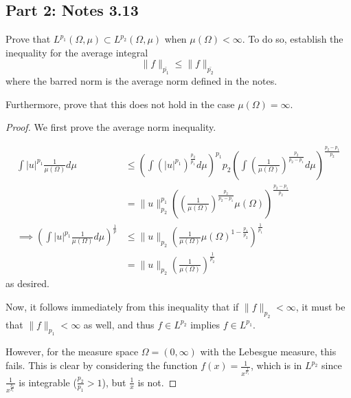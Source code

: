 \documentclass[fontsize=11pt]{scrartcl} %
\numberwithin{equation}{section} %
\numberwithin{figure}{section} %
\numberwithin{table}{section} %
\begin{document}
\subsection*{Part 2: Notes 3.13}
Prove that $L^{p_1}(\Omega,\mu)\subset L^{p_2}(\Omega,\mu)$ when
$\mu(\Omega)<\infty$. To do so, establish the inequality for the average
integral
\[
    \|f\|_{\bar{p_1}} \leq \|f\|_{\bar{p_2}}
\]
where the barred norm is the average norm defined in the notes.

Furthermore, prove that this does not hold in the case $\mu(\Omega)=\infty$.
\\
\begin{proof}
We first prove the average norm inequality.

    \[
    \begin{aligned}
        \int |u|^{p_1}\frac{1}{\mu(\Omega)}d\mu &\leq \left(\int
        (|u|^{p_1})^{\frac{p_2}{p_1}}d\mu\right)^{p_1}{p_2}
        \left(\int
        (\frac{1}{\mu(\Omega)})^{\frac{p_2}{p_2-p_1}}d\mu\right)^{\frac{p_2-p_1}{p_2}}\\
        &=\|u\|_{p_2}^{p_1}((\frac{1}{\mu(\Omega)})^{\frac{p_2}{p_2-p_1}}\mu(\Omega))^{\frac{p_2-p_1}{p_2}}\\
        \implies (\int |u|^{p_1}\frac{1}{\mu(\Omega)}d\mu)^{\frac{1}{p}}
        &\leq
        \|u\|_{p_2}(\frac{1}{\mu(\Omega)}\mu(\Omega)^{1-\frac{p_1}{p_2}})^{\frac{1}{p_1}}\\
        &= \|u\|_{p_2}(\frac{1}{\mu(\Omega)})^{\frac{1}{p_2}}
    \end{aligned}
    \]
    as desired.

    Now, it follows immediately from this inequality that if $\|f\|_{p_2}
    <\infty$, it must be that $\|f\|_{p_1} < \infty$ as well, and thus $f\in
    L^{p_2}$ implies $f\in L^{p_1}$.

    However, for the measure space $\Omega = (0,\infty)$ with the Lebesgue
    measure, this fails. This is clear by considering the function $f(x) =
    \frac{1}{x^{\frac{1}{p_1}}}$, which is in $L^{p_2}$ since
    $\frac{1}{x^{\frac{p_2}{p_1}}}$ is integrable ($\frac{p_2}{p_1} > 1$), but
    $\frac{1}{x}$ is not.
\end{proof}
\end{document}
